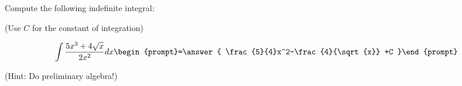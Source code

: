 \documentclass{ximera}
\author{Jim Talamo}
\begin{document}
\begin{exercise}
Compute the following indefinite integral:

\begin{prompt} (Use $C$ for the constant of integration) \end{prompt}

\[
\int \frac{5x^3+4\sqrt{x}}{2x^2}  dx 
\begin{prompt}=\answer{ \frac{5}{4}x^2-\frac{4}{\sqrt{x}}  +C }\end{prompt}
\]

(Hint: Do preliminary algebra!)
\end{exercise}
\end{document}
